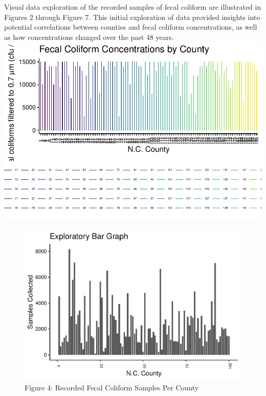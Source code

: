\documentclass[12pt,]{article}
\begin{document}
Visual data exploration of the recorded samples of fecal coliform are
illustrated in Figures 2 through Figure 7. This initial exploration of
data provided insights into potential correlations between counties and
fecal coliform concentrations, as well as how concentrations changed
over the past 48 years.
\includegraphics{Edmondson_ENV872_Project_files/figure-latex/unnamed-chunk-1-1.pdf}

\begin{figure}
\centering
\includegraphics{Edmondson_ENV872_Project_files/figure-latex/unnamed-chunk-3-1.pdf}
\caption{Figure 4: Recorded Fecal Coliform Samples Per County}
\end{figure}
\end{document}
